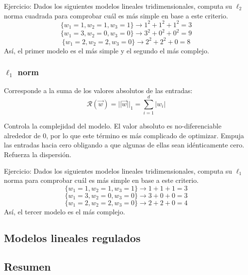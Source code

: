 Ejercicio: Dados los siguientes modelos lineales tridimensionales, computa su $\ell_2$ norma cuadrada para comprobar cuál es más simple en base a este criterio.
$$\{w_1 = 1, w_2 = 1, w_3 = 1\} \rightarrow 1^2 + 1^2 + 1^2 = 3$$
$$\{w_1 = 3, w_2 = 0, w_3 = 0\} \rightarrow 3^2 + 0^2 + 0^2 = 9$$
$$\{w_1 = 2, w_2 = 2, w_3 = 0\} \rightarrow 2^2 + 2^2 + 0 = 8 $$
Así, el primer modelo es el más simple y el segundo el más complejo.

\subsubsection{$\ell_1$ norm}
Corresponde a la suma de los valores absolutos de las entradas:
$$\mathcal{R}(\vec{w}) = ||\vec{w}||_1 = \sum^d_{i=1} |w_i|$$

Controla la complejidad del modelo. El valor absoluto es no-diferenciable alrededor de 0, por lo que este término es más complicado de optimizar.  Empuja las entradas hacia cero obligando a que algunas de ellas sean idénticamente cero. Refuerza la dispersión.

Ejercicio: Dados los siguientes modelos lineales tridimensionales, computa su $\ell_1$ norma para comprobar cuál es más simple en base a este criterio.
$$\{w_1 = 1, w_2 = 1, w_3 = 1\} \rightarrow 1 + 1 + 1 = 3$$
$$\{w_1 = 3, w_2 = 0, w_3 = 0\} \rightarrow 3 + 0 + 0 = 3$$
$$\{w_1 = 2, w_2 = 2, w_3 = 0\} \rightarrow 2 + 2 + 0 = 4 $$
Así, el tercer modelo es el más complejo.

\subsection{Modelos lineales regulados}

\subsection{Resumen}